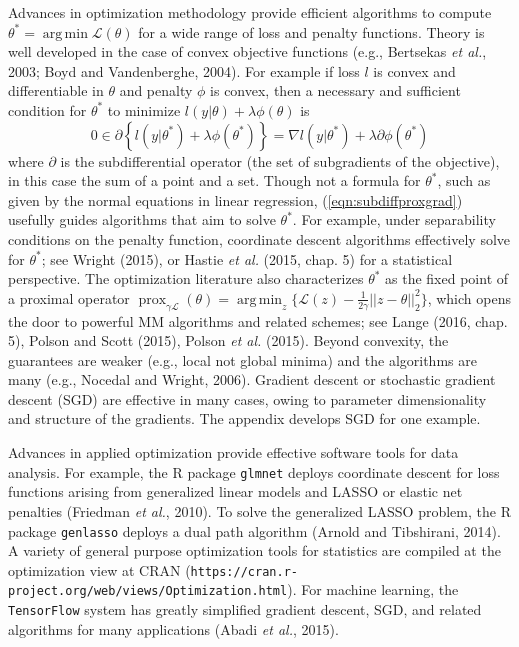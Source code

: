 \documentclass[12pt]{TD-CJS}
\newcommand{\prox}{ \mathop{\mathrm{prox}} }
\DeclareMathOperator*{\argmin}{arg\,min}
\begin{document}
Advances in optimization methodology provide efficient algorithms
to compute $\theta^* = \argmin \mathcal{L}(\theta)$  for a wide range of  loss and penalty functions. 
Theory is well developed in the case of convex objective functions (e.g., Bertsekas {\em et al.}, 2003; Boyd and Vandenberghe, 2004). For example
if loss $l$ is convex and differentiable in $\theta$ and penalty $\phi$ is convex, then 
a necessary and sufficient condition for $\theta^*$ to minimize $ l(y|\theta) + \lambda\phi(\theta)$  is 
\begin{equation}
\label{eqn:subdiffproxgrad}
0 \in \partial \left\{ l(y|\theta^*) + \lambda\phi(\theta^*)\right\} = \nabla l(y|\theta^*) + \lambda\partial \phi(\theta^*) 
\end{equation}
where $\partial$ is the subdifferential operator (the set of subgradients of the objective), in this case
the sum of a point and a set.   Though not a formula for $\theta^*$, such as given by the normal equations in linear regression, 
(\ref{eqn:subdiffproxgrad}) usefully guides algorithms that aim to solve $\theta^*$.   
For example, under separability conditions on the penalty function, coordinate descent algorithms effectively solve for $\theta^*$;
see Wright (2015), or  Hastie {\em et al.} (2015, chap. 5) for a statistical perspective.
The optimization literature also characterizes $\theta^*$ as the fixed point of a proximal operator
$\prox_{\gamma \mathcal{L}}(\theta) = \argmin_z \{ \mathcal{L}(z) - \frac{1}{2\gamma} || z - \theta||_2^2  \}$, 
which opens the door to powerful MM algorithms and related schemes; 
 see Lange (2016, chap. 5), Polson and Scott (2015), Polson {\em et al.} (2015).  
Beyond convexity, the guarantees are weaker (e.g., local
not global minima) and the algorithms are many (e.g., Nocedal and Wright, 2006).  Gradient descent
or stochastic gradient descent (SGD) are effective in many cases, owing to parameter 
dimensionality and structure of the gradients.  The appendix develops SGD for one example.

Advances in applied optimization provide effective software tools for data analysis. For example, the R package
\verb+glmnet+ deploys coordinate descent for loss functions arising from generalized linear models and LASSO or 
elastic net penalties (Friedman {\em et al.}, 2010). To solve the generalized LASSO problem, the R package 
\verb+genlasso+  deploys a dual path algorithm (Arnold and Tibshirani, 2014).  A variety of general 
purpose optimization tools for statistics are compiled at the optimization view at CRAN 
(\verb+https://cran.r-project.org/web/views/Optimization.html+). For machine learning, the \verb+TensorFlow+ system has greatly simplified 
gradient descent, SGD, and related algorithms for many applications (Abadi {\em et al.}, 2015).  
\end{document}
